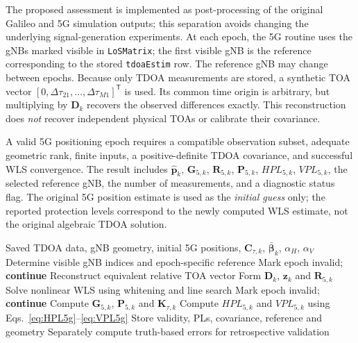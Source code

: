 \documentclass[pdflatex,sn-mathphys-num]{sn-jnl}
\newcommand{\vect}[1]{\boldsymbol{#1}}
\newcommand{\mat}[1]{\mathbf{#1}}
\newcommand{\trans}{^{\mathsf T}}
\begin{document}
The proposed assessment is implemented as post-processing of the original
Galileo and 5G simulation outputs; this separation avoids changing the
underlying signal-generation experiments. At each epoch, the 5G routine
uses the gNBs marked visible in \texttt{LoSMatrix}; the first visible gNB
is the reference corresponding to the stored \texttt{tdoaEstim} row.
The reference gNB may change between epochs. Because only TDOA
measurements are stored, a synthetic TOA vector
$[0,\Delta\tau_{21},\ldots,\Delta\tau_{M1}]\trans$ is used.
Its common time origin is arbitrary, but multiplying by $\mat{D}_k$
recovers the observed differences exactly. This reconstruction does
\emph{not} recover independent physical TOAs or calibrate their covariance.

A valid 5G positioning epoch requires a compatible observation subset,
adequate geometric rank, finite inputs, a positive-definite TDOA
covariance, and successful WLS convergence. The result includes
$\hat{\vect{p}}_k$, $\mat{G}_{5,k}$, $\mat{R}_{5,k}$,
$\mat{P}_{5,k}$, $HPL_{5,k}$, $VPL_{5,k}$,
the selected reference gNB, the number of measurements,
and a diagnostic status flag. The original 5G position estimate is
used as the \emph{initial guess} only; the reported protection levels
correspond to the newly computed WLS estimate, not the original
algebraic TDOA solution.

\begin{algorithm}[t]
\caption{Per-epoch 5G DL-TDOA conditional integrity computation}
\label{alg:5g}
\begin{algorithmic}[1]
\Require Saved TDOA data, gNB geometry, initial 5G positions,
$\mat{C}_{\tau,k}$, $\bar{\vect{\beta}}_k$, $\alpha_H$, $\alpha_V$
  \State Determine visible gNB indices and epoch-specific reference
    \State Mark epoch invalid; \textbf{continue}
  \EndIf
  \State Reconstruct equivalent relative TOA vector
  \State Form $\mat{D}_k$, $\vect{z}_k$ and $\mat{R}_{5,k}$
  \State Solve nonlinear WLS using whitening and line search
    \State Mark epoch invalid; \textbf{continue}
  \EndIf
  \State Compute $\mat{G}_{5,k}$, $\mat{P}_{5,k}$ and $\mat{K}_{\tau,k}$
  \State Compute $HPL_{5,k}$ and $VPL_{5,k}$ using
    Eqs.~\eqref{eq:HPL5g}--\eqref{eq:VPL5g}
  \State Store validity, PLs, covariance, reference and geometry
  \State Separately compute truth-based errors for retrospective validation
\EndFor
\end{algorithmic}
\end{algorithm}
\end{document}
